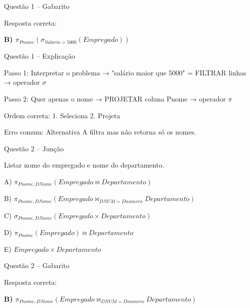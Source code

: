 \documentclass{beamer}
\begin{document}
\begin{frame}{Questão 1 – Gabarito}

Resposta correta:

\Large \textbf{B) $\pi_{Pnome}(\sigma_{Salario > 5000}(Empregado))$}

\end{frame}





\begin{frame}{Questão 1 – Explicação}

Passo 1: Interpretar o problema  
→ "salário maior que 5000" = FILTRAR linhas  
→ operador $\sigma$

Passo 2: Quer apenas o nome  
→ PROJETAR coluna Pnome  
→ operador $\pi$

Ordem correta:
1. Seleciona
2. Projeta

Erro comum:
Alternativa A filtra mas não retorna só os nomes.

\end{frame}









\begin{frame}{Questão 2 – Junção}

Listar nome do empregado e nome do departamento.

A) $\pi_{Pnome, DNome}(Empregado \Join Departamento)$

B) $\pi_{Pnome, DNome}(Empregado \Join_{DNUM=Dnumero} Departamento)$

C) $\sigma_{Pnome, DNome}(Empregado \times Departamento)$

D) $\pi_{Pnome}(Empregado) \Join Departamento$

E) $Empregado \times Departamento$

\end{frame}





\begin{frame}{Questão 2 – Gabarito}

Resposta correta:

\Large \textbf{B) $\pi_{Pnome, DNome}(Empregado \Join_{DNUM=Dnumero} Departamento)$}

\end{frame}
\end{document}
